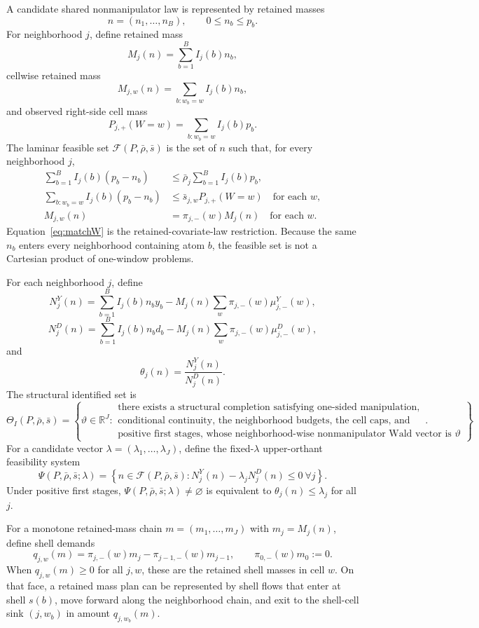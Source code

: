 \documentclass[11pt]{article}
\newcommand{\R}{\mathbb{R}}
\theoremstyle{definition}
\theoremstyle{plain}
\theoremstyle{remark}
\begin{document}
A candidate shared nonmanipulator law is represented by retained masses
\[
  n=(n_1,\ldots,n_B),\qquad 0\le n_b\le p_b.
\]
For neighborhood \(j\), define retained mass
\[
  M_j(n)=\sum_{b=1}^B I_j(b)n_b,
\]
cellwise retained mass
\[
  M_{j,w}(n)=\sum_{b:w_b=w} I_j(b)n_b,
\]
and observed right-side cell mass
\[
  P_{j,+}(W=w)=\sum_{b:w_b=w} I_j(b)p_b.
\]
The laminar feasible set \(\mathcal F(P,\bar\rho,\bar s)\) is the set of \(n\) such that, for
every neighborhood \(j\),
\begin{align}
  \sum_{b=1}^B I_j(b)(p_b-n_b) &\le \bar\rho_j \sum_{b=1}^B I_j(b)p_b,
  \label{eq:global-budget} \\
  \sum_{b:w_b=w} I_j(b)(p_b-n_b) &\le \bar s_{j,w} P_{j,+}(W=w)
  \quad\text{for each }w, \label{eq:cell-budget} \\
  M_{j,w}(n) &= \pi_{j,-}(w) M_j(n) \quad\text{for each }w. \label{eq:matchW}
\end{align}
Equation~\eqref{eq:matchW} is the retained-covariate-law restriction. Because the same \(n_b\)
enters every neighborhood containing atom \(b\), the feasible set is not a Cartesian product
of one-window problems.

For each neighborhood \(j\), define
\[
  N_j^Y(n)=\sum_{b=1}^B I_j(b)n_b y_b
  - M_j(n)\sum_w \pi_{j,-}(w)\mu^Y_{j,-}(w),
\]
\[
  N_j^D(n)=\sum_{b=1}^B I_j(b)n_b d_b
  - M_j(n)\sum_w \pi_{j,-}(w)\mu^D_{j,-}(w),
\]
and
\[
  \theta_j(n)=\frac{N_j^Y(n)}{N_j^D(n)}.
\]
The structural identified set is
\[
  \Theta_I(P,\bar\rho,\bar s)=
  \left\{
    \vartheta\in\R^J:
    \begin{array}{l}
      \text{there exists a structural completion satisfying one-sided manipulation,} \\
      \text{conditional continuity, the neighborhood budgets, the cell caps, and} \\
      \text{positive first stages, whose neighborhood-wise nonmanipulator Wald vector is }\vartheta
    \end{array}
  \right\}.
\]
For a candidate vector \(\lambda=(\lambda_1,\ldots,\lambda_J)\), define the fixed-\(\lambda\)
upper-orthant feasibility system
\[
  \Psi(P,\bar\rho,\bar s;\lambda)=
  \left\{
    n\in\mathcal F(P,\bar\rho,\bar s):
    N_j^Y(n)-\lambda_j N_j^D(n)\le 0\ \forall j
  \right\}.
\]
Under positive first stages, \(\Psi(P,\bar\rho,\bar s;\lambda)\neq\varnothing\) is equivalent
to \(\theta_j(n)\le \lambda_j\) for all \(j\).

For a monotone retained-mass chain \(m=(m_1,\ldots,m_J)\) with \(m_j=M_j(n)\), define shell
demands
\[
  q_{j,w}(m)=\pi_{j,-}(w)m_j-\pi_{j-1,-}(w)m_{j-1},
  \qquad \pi_{0,-}(w)m_0:=0.
\]
When \(q_{j,w}(m)\ge 0\) for all \(j,w\), these are the retained shell masses in cell \(w\).
On that face, a retained mass plan can be represented by shell flows that enter at shell
\(s(b)\), move forward along the neighborhood chain, and exit to the shell-cell sink
\((j,w_b)\) in amount \(q_{j,w_b}(m)\).
\end{document}

